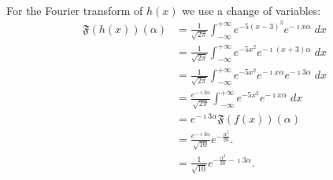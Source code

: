 \documentclass[11pt]{article}
\begin{document}
\begin{solution}
\begin{align*}
    \end{align*}
    For the Fourier transform of $h(x)$ we use a change of variables:
    \begin{align*}
        \mathfrak{F}(h(x))(\alpha)
        &= 
        \frac{1}{\sqrt{2\pi}}
        \int_{-\infty}^{+\infty} e^{-5(x-3)^2} e^{ - \imath x \alpha } \;dx
        \\&= 
        \frac{1}{\sqrt{2\pi}}
        \int_{-\infty}^{+\infty} e^{-5x^2} e^{ - \imath (x + 3) \alpha } \;dx
        \\&= 
        \frac{1}{\sqrt{2\pi}}
        \int_{-\infty}^{+\infty} e^{-5x^2} e^{ - \imath x \alpha } e^{ - \imath 3 \alpha }\;dx
        \\&= 
        \frac{ e^{ - \imath 3 \alpha }}{\sqrt{2\pi}}
        \int_{-\infty}^{+\infty} e^{-5x^2} e^{ - \imath x \alpha }\;dx
        \\&= 
        e^{ - \imath 3 \alpha } 
        \mathfrak{F}(f(x))(\alpha)
        \\&= 
        \frac{e^{ - \imath 3 \alpha }}{\sqrt{10}} e^{-\frac{\alpha^2}{20}}.
        \\&= 
        \frac{1}{\sqrt{10}} e^{-\frac{\alpha^2}{20} - \imath 3 \alpha }
        .
    \end{align*}
\end{solution}
\end{document}
